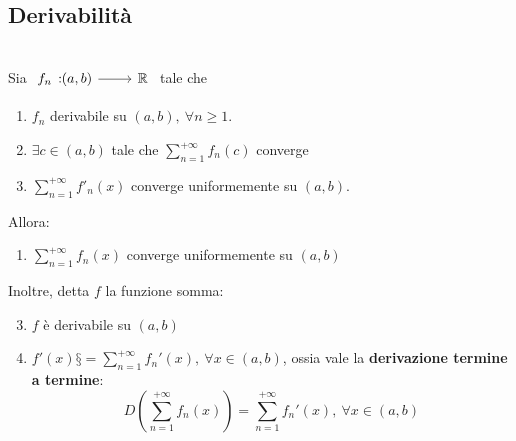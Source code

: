 \subsection{Derivabilità}
\begin{theorema}~{}\\\label{derivabilitatermineatermine}
	Sia $\funz{f_n}{\left(a,b\right)}{\realset}$ tale che
	\begin{enumerate}
		\item $f_n$ derivabile su $\left(a,b\right),\ \forall n\geq 1$.
		\item $\exists c\in\left(a,b\right)$ tale che $\displaystyle\sum_{n=1}^{+\infty}f_n\left(c\right)$ converge
		\item $\displaystyle\sum_{n=1}^{+\infty}f'_n\left(x\right)$ converge uniformemente su $\left(a,b\right)$.
	\end{enumerate}
Allora:
\begin{enumerate}
	\item $\displaystyle\sum_{n=1}^{+\infty}f_n\left(x\right)$ converge uniformemente su $\left(a,b\right)$
\end{enumerate}
Inoltre, detta $f$ la funzione somma:
\begin{enumerate}
		\setcounter{enumi}{2}
\item $f$ è derivabile su $\left(a,b\right)$
\item $\displaystyle f'\left(x\right)§=\sum_{n=1}^{+\infty}f_n'\left(x\right),\ \forall x\in\left(a,b\right)$, ossia vale la \textbf{derivazione termine a termine}:
\begin{equation}
	D\left(\sum_{n=1}^{+\infty}f_n\left(x\right)\right)=\sum_{n=1}^{+\infty}f_n'\left(x\right),\ \forall x\in\left(a,b\right)
\end{equation}
\end{enumerate}
\end{theorema}
